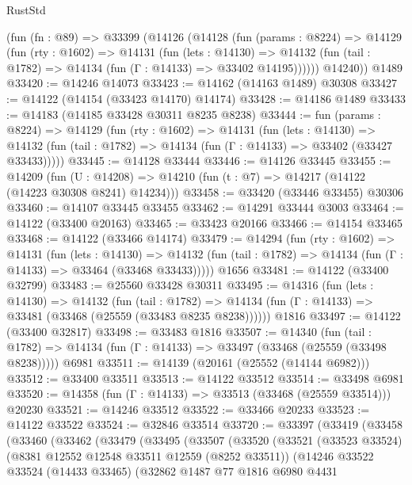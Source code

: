 \begin{lexlean}{RustStd}
\begin{coremodule}
    (fun (fn : @89) =>
    @33399
      (@14126
        (@14128
          (fun (params : @8224) =>
          @14129
            (fun (rty : @1602) =>
            @14131
              (fun (lets : @14130) =>
              @14132 (fun (tail : @1782) => @14134 (fun (Γ : @14133) => @33402 @14195))))))
        @14240))
    @1489
@33420 := @14246 @14073
@33423 := @14162 (@14163 @1489) @30308
@33427 := @14122 (@14154 (@33423 @14170) @14174)
@33428 := @14186 @1489
@33433 := @14183 (@14185 @33428 @30311 @8235 @8238)
@33444 := fun (params : @8224) =>
  @14129
    (fun (rty : @1602) =>
    @14131
      (fun (lets : @14130) =>
      @14132 (fun (tail : @1782) => @14134 (fun (Γ : @14133) => @33402 (@33427 @33433)))))
@33445 := @14128 @33444
@33446 := @14126 @33445
@33455 := @14209
    (fun (U : @14208) => @14210 (fun (t : @7) => @14217 (@14122 (@14223 @30308 @8241) @14234)))
@33458 := @33420 (@33446 @33455) @30306
@33460 := @14107 @33445 @33455
@33462 := @14291 @33444 @3003
@33464 := @14122 (@33400 @20163)
@33465 := @33423 @20166
@33466 := @14154 @33465
@33468 := @14122 (@33466 @14174)
@33479 := @14294
    (fun (rty : @1602) =>
    @14131
      (fun (lets : @14130) =>
      @14132 (fun (tail : @1782) => @14134 (fun (Γ : @14133) => @33464 (@33468 @33433)))))
    @1656
@33481 := @14122 (@33400 @32799)
@33483 := @25560 @33428 @30311
@33495 := @14316
    (fun (lets : @14130) =>
    @14132
      (fun (tail : @1782) =>
      @14134 (fun (Γ : @14133) => @33481 (@33468 (@25559 (@33483 @8235 @8238))))))
    @1816
@33497 := @14122 (@33400 @32817)
@33498 := @33483 @1816
@33507 := @14340
    (fun (tail : @1782) => @14134 (fun (Γ : @14133) => @33497 (@33468 (@25559 (@33498 @8238)))))
    @6981
@33511 := @14139 (@20161 (@25552 (@14144 @6982)))
@33512 := @33400 @33511
@33513 := @14122 @33512
@33514 := @33498 @6981
@33520 := @14358 (fun (Γ : @14133) => @33513 (@33468 (@25559 @33514))) @20230
@33521 := @14246 @33512
@33522 := @33466 @20233
@33523 := @14122 @33522
@33524 := @32846 @33514
@33720 := @33397
    (@33419
      (@33458
        (@33460
          (@33462
            (@33479
              (@33495
                (@33507
                  (@33520
                    (@33521
                      (@33523 @33524)
                      (@8381 @12552 @12548 @33511 @12559 (@8252 @33511))
                      (@14246
                        @33522
                        @33524
                        (@14433 @33465)
                        (@32862
                          @1487
                          @77
                          @1816
                          @6980
                          @4431

\end{coremodule}
\end{lexlean}

